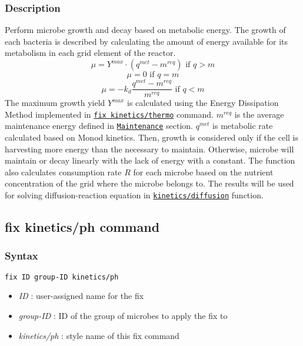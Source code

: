\documentclass[11pt,a4paper,openright]{article}
\begin{document}
\subsubsection*{Description}

Perform microbe growth and decay based on metabolic energy. 
The growth of each bacteria is described by calculating the amount of energy available for its
metabolism in each grid element of the reactor. 
\[ \mu = Y^{max} \cdot (q^{met} - m^{req}) {}\text{  if  } q > m\]
\[ \mu = 0 {} \text{   if  } q = m\]
\[ \mu = -k_d \frac{q^{met} - m^{req}}{m^{req}} {} \text{  if  } q < m\]
The maximum growth yield $Y^{max}$ is calculated using the Energy Dissipation Method 
implemented in \hyperref[fkineticsthermo]{\tt fix kinetics/thermo} command.
$m^{req}$ is the average maintenance energy defined in \hyperref[smaintain]{\tt Maintenance} section.
$q^{met}$ is metabolic rate calculated based on Monod kinetics. 
Then, growth is considered only if the cell is harvesting more energy than the necessary
to maintain. Otherwise, microbe will maintain or decay linearly with the lack of
energy with a constant. The function also calculates consumption rate $R$ for each microbe 
based on the nutrient concentration of the grid where the 
microbe belongs to. The results will be used for solving diffusion-reaction equation
in \hyperref[fkineticsdiffusion]{\tt kinetics/diffusion} function.


\newpage
\subsection{fix kinetics/ph command}
\label{fkineticsph}

\subsubsection*{Syntax}

\begin{Verbatim}[frame=single]
fix ID group-ID kinetics/ph 
\end{Verbatim}

\begin{itemize} [nosep]
\item
	{\it ID }: user-assigned name for the fix
\item
	{\it group-ID }: ID of the group of microbes to apply the fix to
\item
	{\it kinetics/ph  }: style name of this fix command

\end{itemize}
\end{document}
